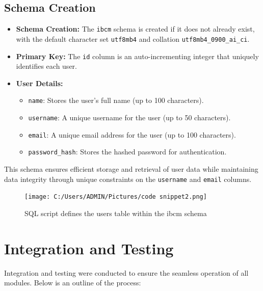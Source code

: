 \documentclass[12pt,a4paper]{report}
\begin{document}
\subsection{Schema Creation}
\begin{itemize}
    \item \textbf{Schema Creation:} The \texttt{ibcm} schema is created if it does not already exist, with the default character set \texttt{utf8mb4} and collation \texttt{utf8mb4\_0900\_ai\_ci}.
    \item \textbf{Primary Key:} The \texttt{id} column is an auto-incrementing integer that uniquely identifies each user.
    \item \textbf{User Details:}
    \begin{itemize}
        \item \texttt{name}: Stores the user's full name (up to 100 characters).
        \item \texttt{username}: A unique username for the user (up to 50 characters).
        \item \texttt{email}: A unique email address for the user (up to 100 characters).
        \item \texttt{password\_hash}: Stores the hashed password for authentication.
    \end{itemize}
\end{itemize}

This schema ensures efficient storage and retrieval of user data while maintaining data integrity through unique constraints on the \texttt{username} and \texttt{email} columns.
\begin{figure}[H]
    \centering
    \texttt{[image: C:/Users/ADMIN/Pictures/code snippet2.png]} %
    \caption[Short caption for the image]{ SQL script defines the users table within the ibcm schema }
    \label{fig:sample_image}
\end{figure}
\section{Integration and Testing}
Integration and testing were conducted to ensure the seamless operation of all modules. Below is an outline of the process:
\end{document}
